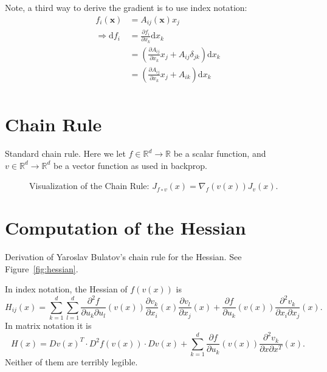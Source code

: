 \documentclass{article}
\newcommand{\drawgraph}[2]{
    \node[circle, draw, minimum size=0.5cm] (f{#1#2}) at (#1,#2+1) {f};
    \node[circle, draw, minimum size=0.5cm] (v{#1#2}) at (#1,#2) {v};
    \node[circle, draw, minimum size=0.5cm] (x{#1#2}) at (#1,#2-1) {x};
    
    \draw[->] (x{#1#2}) -- (v{#1#2});
    \draw[->] (v{#1#2}) -- (f{#1#2});
}
\begin{document}
Note, a third way to derive the gradient is to use index notation:
\begin{align*}
f_i(\mathbf{x}) &= A_{ij}(\mathbf{x}) x_j \\
\Rightarrow \mathrm{d} f_i &= \frac{\partial f_i}{\partial x_k} \mathrm{d} x_k \\
&= \left( \frac{\partial A_{ij}}{\partial x_k} x_j + A_{ij} \delta_{jk} \right) \mathrm{d} x_k \\
&= \left( \frac{\partial A_{ij}}{\partial x_k} x_j + A_{ik} \right) \mathrm{d} x_k \\
\end{align*}


\section{Chain Rule}

Standard chain rule.
Here we let $f\in\mathbb R^d\to \mathbb R$ be a scalar function, and $v\in\mathbb R^d\to \mathbb R^d$ be a vector function as used in backprop.

\begin{figure}[h]
    \centering
    \caption{Visualization of the Chain Rule: $J_{f\circ v}(x) = \nabla_{\!f}(v(x)) J_v(x)$.}
\end{figure}

\section{Computation of the Hessian}

Derivation of Yaroslav Bulatov's chain rule for the Hessian.
See Figure~\ref{fig:hessian}.

In index notation, the Hessian of $f(v(x))$ is
\[
H_{ij}(x) = \sum_{k=1}^d \sum_{l=1}^d \frac{\partial^2 f}{\partial u_k \partial u_l}(v(x)) \frac{\partial v_k}{\partial x_i}(x) \frac{\partial v_l}{\partial x_j}(x) + \frac{\partial f}{\partial u_k}(v(x)) \frac{\partial^2 v_k}{\partial x_i \partial x_j}(x)
.
\]
In matrix notation it is
\[
H(x) = Dv(x)^T \cdot D^2f(v(x)) \cdot Dv(x) + \sum_{k=1}^d \frac{\partial f}{\partial u_k}(v(x)) \frac{\partial^2 v_k}{\partial x \partial x^T}(x).
\]
Neither of them are terribly legible.
\end{document}
